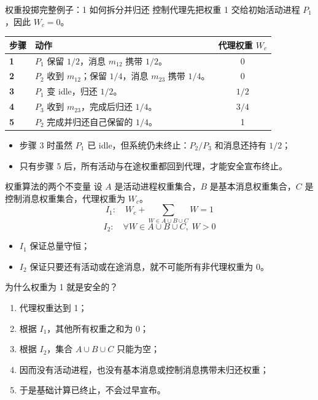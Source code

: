 \documentclass[UTF8,fontset=none,aspectratio=169,10pt]{beamer}
\begin{document}
\begin{frame}{权重投掷完整例子：1 如何拆分并归还}
\small
控制代理先把权重 1 交给初始活动进程 $P_1$，因此 $W_c=0$。
\begin{center}
\begin{tabularx}{.96\linewidth}{>{\bfseries}p{1.5cm}Xc}
\toprule
步骤 & 动作 & 代理权重 $W_c$ \\
\midrule
1 & $P_1$ 保留 $1/2$，消息 $m_{12}$ 携带 $1/2$。 & 0 \\
2 & $P_2$ 收到 $m_{12}$；保留 $1/4$，消息 $m_{23}$ 携带 $1/4$。 & 0 \\
3 & $P_1$ 变 idle，归还 $1/2$。 & $1/2$ \\
4 & $P_3$ 收到 $m_{23}$，完成后归还 $1/4$。 & $3/4$ \\
5 & $P_2$ 完成并归还自己保留的 $1/4$。 & 1 \\
\bottomrule
\end{tabularx}
\end{center}
\begin{itemize}
  \item 步骤 3 时虽然 $P_1$ 已 idle，但系统仍未终止：$P_2/P_3$ 和消息还持有 $1/2$；
  \item 只有步骤 5 后，所有活动与在途权重都回到代理，才能安全宣布终止。
\end{itemize}
\end{frame}

\begin{frame}{权重算法的两个不变量}
设 $A$ 是活动进程权重集合，$B$ 是基本消息权重集合，$C$ 是控制消息权重集合，代理权重为 $W_c$。
\[
I_1:\quad W_c+\sum_{W\in A\cup B\cup C}W=1
\]
\[
I_2:\quad \forall W\in A\cup B\cup C,\;W>0
\]
\begin{itemize}
  \item $I_1$ 保证总量守恒；
  \item $I_2$ 保证只要还有活动或在途消息，就不可能所有非代理权重为 0。
\end{itemize}
\end{frame}

\begin{frame}{为什么权重为 1 就是安全的？}
\begin{enumerate}
  \item 代理权重达到 1；
  \item 根据 $I_1$，其他所有权重之和为 0；
  \item 根据 $I_2$，集合 $A\cup B\cup C$ 只能为空；
  \item 因而没有活动进程，也没有基本消息或控制消息携带未归还权重；
  \item 于是基础计算已终止，不会过早宣布。
\end{enumerate}
\end{frame}
\end{document}
